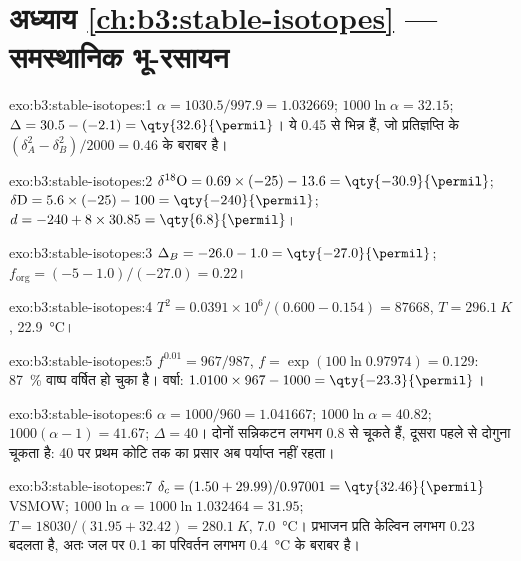 \section*{अध्याय \ref{ch:b3:stable-isotopes} --- समस्थानिक भू-रसायन}

\begin{solution}{exo:b3:stable-isotopes:1}
$\alpha = 1030.5/997.9 = 1.032669$; $1000\ln\alpha = 32.15$; $\Delta = 30.5 -
(-2.1) = \qty{32.6}{\permil}$। ये \qty{0.45}{\permil} से भिन्न हैं, जो
प्रतिज्ञप्ति के $(\delta_A^2 - \delta_B^2)/2000 = 0.46$ के बराबर है।
\end{solution}

\begin{solution}{exo:b3:stable-isotopes:2}
$\delta^{18}\mathrm O = 0.69\times(-25) - 13.6 = \qty{-30.9}{\permil}$;
$\delta\mathrm D = 5.6\times(-25) - 100 = \qty{-240}{\permil}$; $d = -240 +
8\times30.85 = \qty{6.8}{\permil}$।
\end{solution}

\begin{solution}{exo:b3:stable-isotopes:3}
$\Delta_B = -26.0 - 1.0 = \qty{-27.0}{\permil}$; $f_{\mathrm{org}} = (-5 -
1.0)/(-27.0) = 0.22$।
\end{solution}

\begin{solution}{exo:b3:stable-isotopes:4}
$T^2 = 0.0391\times10^6/(0.600 - 0.154) = \num{87668}$, $T = \qty{296.1}{K}$,
\qty{22.9}{\celsius}।
\end{solution}

\begin{solution}{exo:b3:stable-isotopes:5}
$f^{0.01} = 967/987$, $f = \exp(100\ln0.97974) = 0.129$: \qty{87}{\percent} वाष्प
वर्षित हो चुका है। वर्षा: $1.0100\times967 - 1000 =
\qty{-23.3}{\permil}$।
\end{solution}

\begin{solution}{exo:b3:stable-isotopes:6}
$\alpha = 1000/960 = 1.041667$; $1000\ln\alpha = 40.82$; $1000(\alpha - 1) =
41.67$; $\Delta = 40$। दोनों सन्निकटन लगभग \qty{0.8}{\permil} से चूकते हैं,
दूसरा पहले से दोगुना चूकता है: \qty{40}{\permil} पर प्रथम कोटि तक का
प्रसार अब पर्याप्त नहीं रहता।
\end{solution}

\begin{solution}{exo:b3:stable-isotopes:7}
$\delta_c = (1.50 + 29.99)/0.97001 = \qty{32.46}{\permil}$ VSMOW; $1000\ln\alpha
= 1000\ln1.032464 = 31.95$; $T = 18030/(31.95 + 32.42) = \qty{280.1}{K}$,
\qty{7.0}{\celsius}। प्रभाजन प्रति केल्विन लगभग \qty{0.23}{\permil} बदलता है, अतः
जल पर \qty{0.1}{\permil} का परिवर्तन लगभग \qty{0.4}{\celsius} के बराबर है।
\end{solution}

